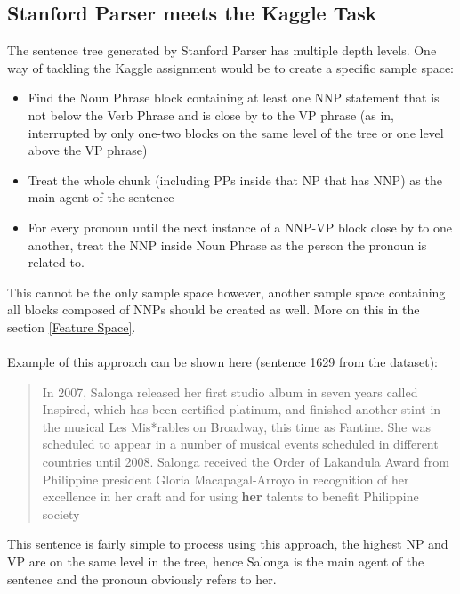 \documentclass{article}
\begin{document}
\subsection{Stanford Parser meets the Kaggle Task}
The sentence tree generated by Stanford Parser has multiple depth levels. One way of tackling the Kaggle assignment would be to create a specific sample space:
\begin{itemize}
    \item Find the Noun Phrase block containing at least one NNP statement that is not below the Verb Phrase and is close by to the VP phrase (as in, interrupted by only one-two blocks on the same level of the tree or one level above the VP phrase)
    \item Treat the whole chunk (including PPs inside that NP that has NNP) as the main agent of the sentence
    \item For every pronoun until the next instance of a NNP-VP block close by to one another, treat the NNP inside Noun Phrase as the person the pronoun is related to.
\end{itemize}
This cannot be the only sample space however, another sample space containing all blocks composed of NNPs should be created as well. More on this in the section \ref{Feature Space}.\\ \\
Example of this approach can be shown here (sentence 1629 from the dataset):
\begin{quote}
    In 2007, Salonga released her first studio album in seven years called Inspired, which has been certified platinum, and finished another stint in the musical Les Mis*rables on Broadway, this time as Fantine. She was scheduled to appear in a number of musical events scheduled in different countries until 2008. Salonga received the Order of Lakandula Award from Philippine president Gloria Macapagal-Arroyo in recognition of her excellence in her craft and for using \textbf{her} talents to benefit Philippine society
\end{quote}
This sentence is fairly simple to process using this approach, the highest NP and VP are on the same level in the tree, hence Salonga is the main agent of the sentence and the pronoun obviously refers to her.
\end{document}
